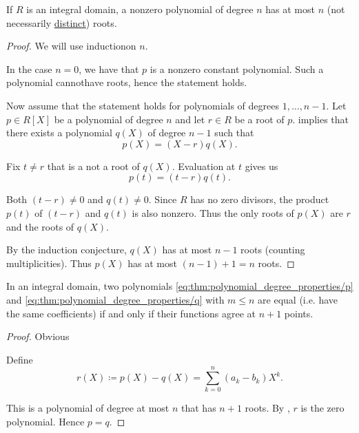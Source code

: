 \begin{proposition}\label{thm:integral_domain_polynomial_root_limit}
  If \( R \) is an integral domain, a nonzero polynomial of degree \( n \) has at most \( n \) (not necessarily \hyperref[def:polynomial_root_multiplicity]{distinct}) roots.
\end{proposition}
\begin{proof}
  We will use induction\IND on \( n \).

  In the case \( n = 0 \), we have that \( p \) is a nonzero constant polynomial. Such a polynomial cannot\DNE have roots, hence the statement holds.

  Now assume that the statement holds for polynomials of degrees \( 1, \ldots, n - 1 \). Let \( p \in R[X] \) be a polynomial of degree \( n \) and let \( r \in R \) be a root of \( p \).  implies that there exists a polynomial \( q(X) \) of degree \( n - 1 \) such that
  \begin{equation*}
    p(X) = (X - r) q(X).
  \end{equation*}

  Fix \( t \neq r \) that is a not a root of \( q(X) \). Evaluation at \( t \) gives us
  \begin{equation*}
    p(t) = (t - r) q(t).
  \end{equation*}

  Both \( (t - r) \neq 0 \) and \( q(t) \neq 0 \). Since \( R \) has no zero divisors, the product \( p(t) \) of \( (t - r) \) and \( q(t) \) is also nonzero. Thus the only roots of \( p(X) \) are \( r \) and the roots of \( q(X) \).

  By the induction conjecture, \( q(X) \) has at most \( n - 1 \) roots (counting multiplicities). Thus \( p(X) \) has at most \( (n - 1) + 1 = n \) roots.
\end{proof}

\begin{proposition}\label{thm:polynomials_with_identical_values}
  In an integral domain, two polynomials \eqref{eq:thm:polynomial_degree_properties/p} and \eqref{eq:thm:polynomial_degree_properties/q} with \( m \leq n \) are equal (i.e. have the same coefficients) if and only if their functions agree at \( n + 1 \) points.
\end{proposition}
\begin{proof}
  \SufficiencySubProof Obvious

  \NecessitySubProof Define
  \begin{equation*}
    r(X) \coloneqq p(X) - q(X) = \sum_{k=0}^n (a_k - b_k) X^k.
  \end{equation*}

  This is a polynomial of degree at most \( n \) that has \( n + 1 \) roots. By , \( r \) is the zero polynomial. Hence \( p = q \).
\end{proof}

